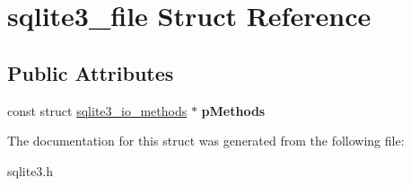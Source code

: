 \hypertarget{structsqlite3__file}{}\section{sqlite3\+\_\+file Struct Reference}
\label{structsqlite3__file}
\subsection*{Public Attributes}
\begin{DoxyCompactItemize}
\item 
\mbox{\label{structsqlite3__file_adfc58b2d7514112375d7330e2881bc70}} 
const struct \mbox{\hyperlink{structsqlite3__io__methods}{sqlite3\+\_\+io\+\_\+methods}} $\ast$ {\bfseries p\+Methods}
\end{DoxyCompactItemize}


The documentation for this struct was generated from the following file\+:\begin{DoxyCompactItemize}
\item 
sqlite3.\+h\end{DoxyCompactItemize}
